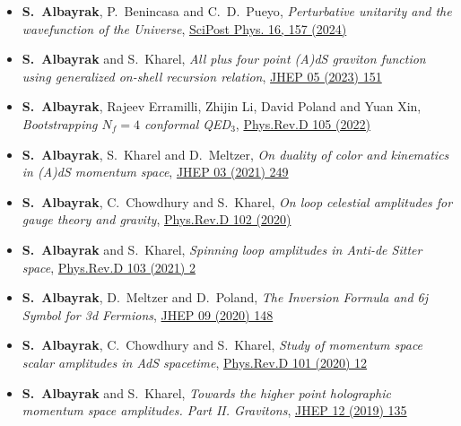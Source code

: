 \documentclass[a4paper,11pt]{article}
\begin{document}
 \begin{itemize}%
  	 \item[] {\bf S.~Albayrak}, {P.~Benincasa} and {C.~D.~Pueyo}, \emph{Perturbative unitarity and the wavefunction of the Universe}, \hyperref{https://doi.org/10.21468/SciPostPhys.16.6.157}{}{}{SciPost Phys. 16, 157 (2024)} 
  	 
 	 \item[] {\bf S.~Albayrak} and  { S.~Kharel}, \emph{All plus four point (A)dS graviton function using generalized on-shell recursion relation}, \hyperref{https://inspirehep.net/literature/2634747}{}{}{JHEP 05 (2023) 151} 
 	
  	\item[] {\bf S.~Albayrak}, Rajeev Erramilli, Zhijin Li, David Poland  and Yuan Xin, \emph{Bootstrapping $N_f=4$ conformal QED$_3$}, \hyperref{https://inspirehep.net/literature/1984752}{}{}{Phys.Rev.D 105 (2022)}
 	
  	\item[] {\bf S.~Albayrak}, { S.~Kharel} and {D.~Meltzer}, \emph{On duality of color and kinematics in (A)dS momentum space}, \hyperref{https://inspirehep.net/literature/1837623}{}{}{JHEP 03 (2021) 249}
 	\item[] {\bf S.~Albayrak}, C.~Chowdhury and  { S.~Kharel}, \emph{On loop celestial amplitudes for gauge theory and gravity}, \hyperref{https://inspirehep.net/literature/1807927}{}{}{ Phys.Rev.D 102 (2020)}
 	
 \item[] {\bf S.~Albayrak} and  { S.~Kharel}, \emph{Spinning loop amplitudes in Anti-de Sitter space}, \hyperref{https://inspirehep.net/literature/1802534}{}{}{Phys.Rev.D 103 (2021) 2} 
 
 \item[] {\bf S.~Albayrak}, D.~Meltzer and  { D.~Poland}, \emph{The Inversion Formula and 6j Symbol for 3d Fermions}, \hyperref{https://inspirehep.net/files/ff4743ee85b68ab8565052dbd4928f62}{}{}{JHEP 09 (2020) 148}
 
 \item[] {\bf S.~Albayrak}, C.~Chowdhury and  { S.~Kharel}, \emph{Study of momentum space scalar amplitudes in AdS spacetime}, \hyperref{https://inspirehep.net/files/950d888f8dbaf39b96ea1bee25d6bda0}{}{}{Phys.Rev.D 101 (2020) 12}
 
 \item[] {\bf S.~Albayrak} and  { S.~Kharel}, \emph{Towards the higher point holographic momentum space amplitudes. Part II. Gravitons}, \hyperref{https://inspirehep.net/files/eb148d7ad84e19945017f5ab2aa85393}{}{}{JHEP 12 (2019) 135}
 

\end{itemize}
\end{document}
